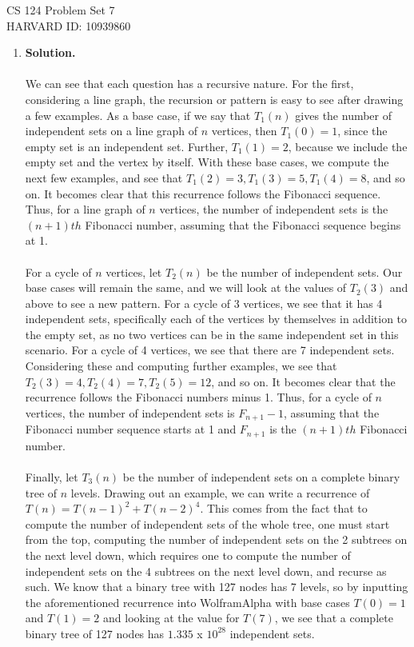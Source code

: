 \documentclass[11pt]{article}
\newcommand\solution{%
  \textbf{Solution.}\\%
}
\begin{document}
CS 124 Problem Set 7 \\
\indent HARVARD ID: 10939860

\begin{enumerate}

\item

\solution \\
We can see that each question has a recursive nature. For the first, considering a line graph, the recursion or pattern is easy to see after drawing a few examples. As a base case, if we say that $T_1(n)$ gives the number of independent sets on a line graph of $n$ vertices, then $T_1(0) = 1$, since the empty set is an independent set. Further, $T_1(1) = 2$, because we include the empty set and the vertex by itself. With these base cases, we compute the next few examples, and see that $T_1(2) = 3, T_1(3) = 5, T_1(4) = 8$, and so on. It becomes clear that this recurrence follows the Fibonacci sequence. Thus, for a line graph of $n$ vertices, the number of independent sets is the $(n+1)th$ Fibonacci number, assuming that the Fibonacci sequence begins at 1. \\
\\
For a cycle of $n$ vertices, let $T_2(n)$ be the number of independent sets. Our base cases will remain the same, and we will look at the values of $T_2(3)$ and above to see a new pattern. For a cycle of 3 vertices, we see that it has 4 independent sets, specifically each of the vertices by themselves in addition to the empty set, as no two vertices can be in the same independent set in this scenario. For a cycle of 4 vertices, we see that there are 7 independent sets. Considering these and computing further examples, we see that $T_2(3) = 4, T_2(4) = 7, T_2(5) = 12$, and so on. It becomes clear that the recurrence follows the Fibonacci numbers minus 1. Thus, for a cycle of $n$ vertices, the number of independent sets is $F_{n+1} - 1$, assuming that the Fibonacci number sequence starts at 1 and $F_{n+1}$ is the $(n+1)th$ Fibonacci number. \\
\\
Finally, let $T_3(n)$ be the number of independent sets on a complete binary tree of $n$ levels. Drawing out an example, we can write a recurrence of $T(n) = T(n-1)^2 + T(n-2)^4$. This comes from the fact that to compute the number of independent sets of the whole tree, one must start from the top, computing the number of independent sets on the 2 subtrees on the next level down, which requires one to compute the number of independent sets on the 4 subtrees on the next level down, and recurse as such. We know that a binary tree with 127 nodes has 7 levels, so by inputting the aforementioned recurrence into WolframAlpha with base cases $T(0) = 1$ and $T(1) = 2$ and looking at the value for $T(7)$, we see that a complete binary tree of 127 nodes has $1.335$ x $10^{28}$ independent sets. 


\end{enumerate}
\end{document}

